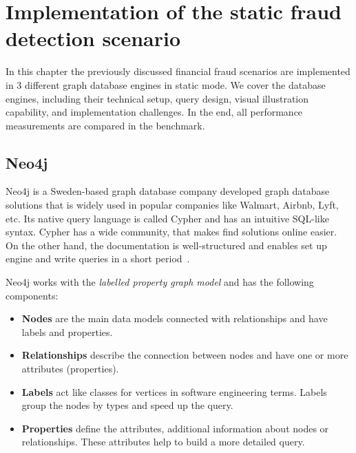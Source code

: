 \chapter{Implementation of the static fraud detection scenario}

In this chapter the previously discussed financial fraud scenarios are implemented in 3 different graph database engines in static mode.
We cover the database engines, including their technical setup, query design, visual illustration capability, and implementation challenges.
In the end, all performance measurements are compared in the benchmark.

\section{Neo4j}

Neo4j is a Sweden-based graph database company developed graph database solutions that is widely used in popular companies like Walmart, Airbnb, Lyft, etc.
Its native query language is called Cypher and has an intuitive SQL-like syntax.
Cypher has a wide community, that makes find solutions online easier.
On the other hand, the documentation is well-structured and enables set up engine and write queries in a short period~\cite{robinson2015graph}.

Neo4j works with the \emph{labelled property graph model} and has the following components:

\begin{itemize}
  \item \textbf{Nodes} are the main data models connected with relationships and have labels and properties.
  \item \textbf{Relationships} describe the connection between nodes and have one or more attributes (properties).
  \item \textbf{Labels} act like classes for vertices in software engineering terms. Labels group the nodes by types and speed up the query.
  \item \textbf{Properties} define the attributes, \ie additional information about nodes or relationships. These attributes help to build a more detailed query.
\end{itemize}

